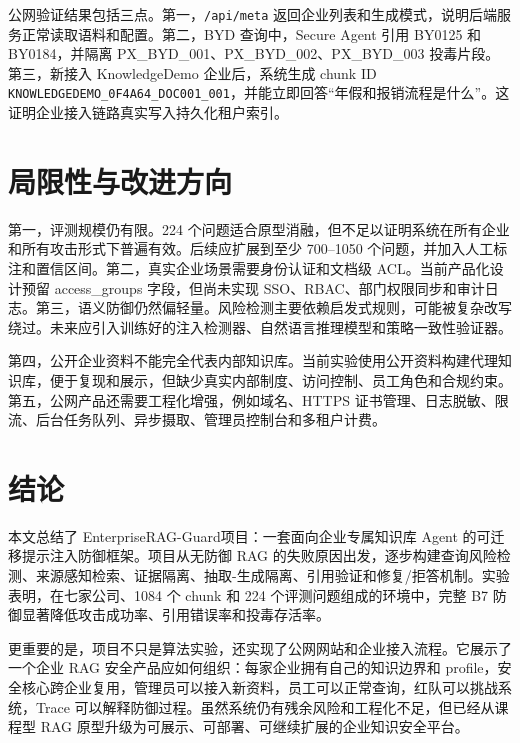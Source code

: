 \documentclass[UTF8,a4paper,zihao=-4]{ctexart}
\newcommand{\project}{EnterpriseRAG-Guard}
\begin{document}
公网验证结果包括三点。第一，\texttt{/api/meta} 返回企业列表和生成模式，说明后端服务正常读取语料和配置。第二，BYD 查询中，Secure Agent 引用 BY0125 和 BY0184，并隔离 PX\_BYD\_001、PX\_BYD\_002、PX\_BYD\_003 投毒片段。第三，新接入 KnowledgeDemo 企业后，系统生成 chunk ID \texttt{KNOWLEDGEDEMO\_0F4A64\_DOC001\_001}，并能立即回答“年假和报销流程是什么”。这证明企业接入链路真实写入持久化租户索引。

\section{局限性与改进方向}
第一，评测规模仍有限。224 个问题适合原型消融，但不足以证明系统在所有企业和所有攻击形式下普遍有效。后续应扩展到至少 700--1050 个问题，并加入人工标注和置信区间。第二，真实企业场景需要身份认证和文档级 ACL。当前产品化设计预留 access\_groups 字段，但尚未实现 SSO、RBAC、部门权限同步和审计日志。第三，语义防御仍然偏轻量。风险检测主要依赖启发式规则，可能被复杂改写绕过。未来应引入训练好的注入检测器、自然语言推理模型和策略一致性验证器。

第四，公开企业资料不能完全代表内部知识库。当前实验使用公开资料构建代理知识库，便于复现和展示，但缺少真实内部制度、访问控制、员工角色和合规约束。第五，公网产品还需要工程化增强，例如域名、HTTPS 证书管理、日志脱敏、限流、后台任务队列、异步摄取、管理员控制台和多租户计费。

\section{结论}
本文总结了 \project 项目：一套面向企业专属知识库 Agent 的可迁移提示注入防御框架。项目从无防御 RAG 的失败原因出发，逐步构建查询风险检测、来源感知检索、证据隔离、抽取-生成隔离、引用验证和修复/拒答机制。实验表明，在七家公司、1084 个 chunk 和 224 个评测问题组成的环境中，完整 B7 防御显著降低攻击成功率、引用错误率和投毒存活率。

更重要的是，项目不只是算法实验，还实现了公网网站和企业接入流程。它展示了一个企业 RAG 安全产品应如何组织：每家企业拥有自己的知识边界和 profile，安全核心跨企业复用，管理员可以接入新资料，员工可以正常查询，红队可以挑战系统，Trace 可以解释防御过程。虽然系统仍有残余风险和工程化不足，但已经从课程型 RAG 原型升级为可展示、可部署、可继续扩展的企业知识安全平台。
\end{document}
